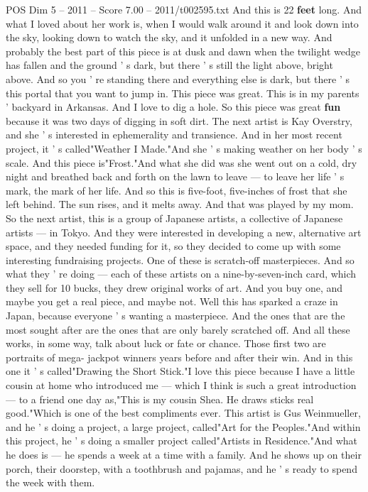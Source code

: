 \begin{textsample}{POS Dim 5 – 2011 – Score 7.00 – 2011/t002595.txt}
And this is 22 \textbf{feet} long.
And what I loved about her work is, when I would walk around it and look down into the sky, looking down to watch the sky, and it unfolded in a new way.
And probably the best part of this piece is at dusk and dawn when the twilight wedge has fallen and the ground ' s dark, but there ' s still the light above, bright above.
And so you ' re standing there and everything else is dark, but there ' s this portal that you want to jump in.
This piece was great.
This is in my parents ' backyard in Arkansas.
And I love to dig a hole.
So this piece was great \textbf{fun} because it was two days of digging in soft dirt.
The next artist is Kay Overstry, and she ' s interested in ephemerality and transience.
And in her most recent project, it ' s called"Weather I Made."And she ' s making weather on her body ' s scale.
And this piece is"Frost."And what she did was she went out on a cold, dry night and breathed back and forth on the lawn to leave — to leave her life ' s mark, the mark of her life.
And so this is five-foot, five-inches of frost that she left behind.
The sun rises, and it melts away.
And that was played by my mom.
So the next artist, this is a group of Japanese artists, a collective of Japanese artists — in Tokyo.
And they were interested in developing a new, alternative art space, and they needed funding for it, so they decided to come up with some interesting fundraising projects.
One of these is scratch-off masterpieces.
And so what they ' re doing — each of these artists on a nine-by-seven-inch card, which they sell for 10 bucks, they drew original works of art.
And you buy one, and maybe you get a real piece, and maybe not.
Well this has sparked a craze in Japan, because everyone ' s wanting a masterpiece.
And the ones that are the most sought after are the ones that are only barely scratched off.
And all these works, in some way, talk about luck or fate or chance.
Those first two are portraits of mega- jackpot winners years before and after their win.
And in this one it ' s called"Drawing the Short Stick."I love this piece because I have a little cousin at home who introduced me — which I think is such a great introduction — to a friend one day as,"This is my cousin Shea.
He draws sticks real good."Which is one of the best compliments ever.
This artist is Gus Weinmueller, and he ' s doing a project, a large project, called"Art for the Peoples."And within this project, he ' s doing a smaller project called"Artists in Residence."And what he does is — he spends a week at a time with a family.
And he shows up on their porch, their doorstep, with a toothbrush and pajamas, and he ' s ready to spend the week with them.

\end{textsample}
